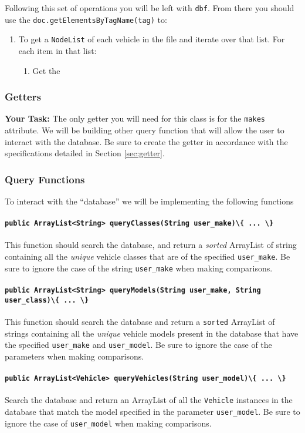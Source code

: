 Following this set of operations you will be left with \lstinline|dbf|. From there
you should use the \lstinline|doc.getElementsByTagName(tag)| to:
\begin{enumerate}
    \item To get a \lstinline|NodeList| of each vehicle in the file and iterate over that list. For each item in that list:
    \begin{enumerate}
        \item Get the 
    \end{enumerate}
\end{enumerate}

\subsubsection{Getters}

\textbf{Your Task:} 
The only getter you will need for this class is for the \lstinline|makes|
attribute. We will be building other query function that will allow the user to
interact with the database. Be sure to create the getter in accordance with
the specifications detailed in Section \ref{sec:getter}.

\subsubsection{Query Functions}

To interact with the ``database'' we will be implementing the following functions 

\paragraph{\lstinline|public ArrayList<String> queryClasses(String
user_make)\{ ... \}|} This function should  search the database, and return a
\textit{sorted} ArrayList of string containing all the \textit{unique} vehicle
classes that are of the specified \lstinline|user_make|. Be sure to ignore the
case of the string \lstinline|user_make| when making comparisons.

\paragraph{\lstinline|public ArrayList<String> queryModels(String user_make,
String user_class)\{ ... \}|} This function should search the database and return a
\lstinline{sorted} ArrayList of strings containing all the \textit{unique}
vehicle models present in the database that have the specified
\lstinline|user_make| and \lstinline|user_model|. Be sure to ignore the case of
the parameters when making comparisons.

\paragraph{\lstinline|public ArrayList<Vehicle> queryVehicles(String
user_model)\{ ... \}|} Search the database and return an ArrayList of all the
\lstinline|Vehicle| instances in the database that match the model specified in
the parameter \lstinline|user_model|. Be sure to ignore the case of
\lstinline|user_model| when making comparisons.
